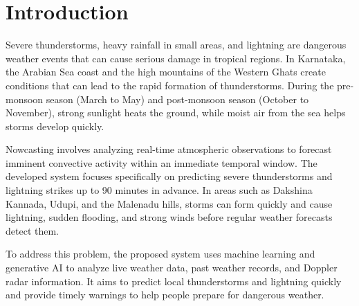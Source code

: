 \documentclass[12pt,a4paper]{report}
\begin{document}
\newpage
\listoffigures
\thispagestyle{empty}

\newpage
\listoftables
\thispagestyle{empty}

\newpage
{}
\setcounter{page}{1}
\pagestyle{fancy}

\chapter{Introduction}
\thispagestyle{empty}

Severe thunderstorms, heavy rainfall in small areas, and lightning are dangerous weather events that can cause serious damage in tropical regions. In Karnataka, the Arabian Sea coast and the high mountains of the Western Ghats create conditions that can lead to the rapid formation of thunderstorms. During the pre-monsoon season (March to May) and post-monsoon season (October to November), strong sunlight heats the ground, while moist air from the sea helps storms develop quickly.

Nowcasting involves analyzing real-time atmospheric observations to forecast imminent convective activity within an immediate temporal window. The developed system focuses specifically on predicting severe thunderstorms and lightning strikes up to 90 minutes in advance. In areas such as Dakshina Kannada, Udupi, and the Malenadu hills, storms can form quickly and cause lightning, sudden flooding, and strong winds before regular weather forecasts detect them.

To address this problem, the proposed system uses machine learning and generative AI to analyze live weather data, past weather records, and Doppler radar information. It aims to predict local thunderstorms and lightning quickly and provide timely warnings to help people prepare for dangerous weather.
\end{document}
